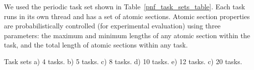 \documentclass[a4paper,english]{article}
\begin{document}
We used the periodic task set shown in Table~\ref{pnf_task_sets_table}. Each task runs in its own thread and has a set of atomic sections. Atomic section properties are probabilistically controlled (for experimental evaluation) using three parameters: the maximum and minimum lengths of any atomic section within the task, and the total length of atomic sections within any task.

\begin{flushleft}
\begin{table}[htbp]
\begin{centering}
\caption{\label{pnf_task_sets_table}Task sets \label{tab:Task-sets-a)pnf4}a) 4 tasks. \label{tab:task-sets-c}b) 5 tasks. \label{tab:Task-sets-a)pnf8}c) 8 tasks. \label{tab:task set e}d) 10 tasks. \label{tab:task sets f}e) 12 tasks. \label{tab:Task-sets-a)pnf20}c) 20 tasks.}


\end{centering}
\end{table}
\end{flushleft}
\end{document}
